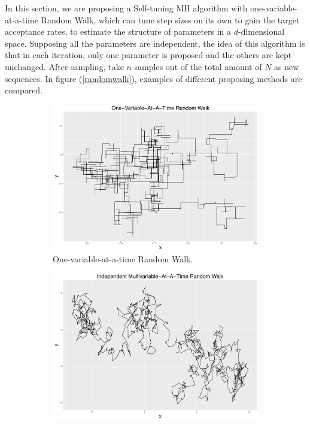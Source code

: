 In this section, we are proposing a Self-tuning MH algorithm with one-variable-at-a-time Random Walk, which can tune step sizes on its own to gain the target acceptance rates, to estimate the structure of parameters in a $d$-dimensional space. Supposing all the parameters are independent, the idea of this algorithm is that in each iteration, only one parameter is proposed and the others are kept unchanged. After sampling, take $n$ samples out of the total amount of $N$ as new sequences. In figure (\ref{randomwalk}), examples of different proposing methods are compared. 
\begin{figure}[h]
\centering
 \begin{subfigure}[b]{0.32\textwidth}
     \includegraphics[width=\textwidth]{Chapters/05MCMCOU/plots/ggoneRW.pdf}
     \caption{\footnotesize One-variable-at-a-time Random Walk.}
\end{subfigure}
\begin{subfigure}[b]{0.32\textwidth}
     \includegraphics[width=\textwidth]{Chapters/05MCMCOU/plots/ggindRW.pdf}

\end{subfigure}
\end{figure}
